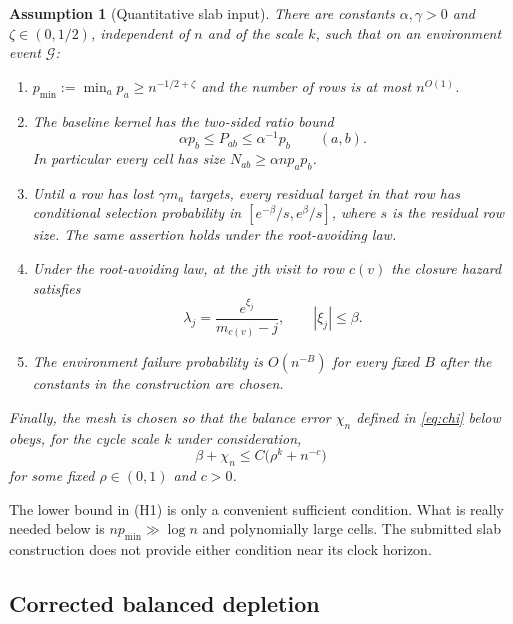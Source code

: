 \documentclass[11pt]{article}
\newcommand{\1}{\mathbf 1}
\newcommand{\cG}{\mathcal G}
\newtheorem{assumption}[theorem]{Assumption}
\theoremstyle{remark}
\begin{document}
\begin{assumption}[Quantitative slab input]\label{ass:slab}
There are constants $\alpha,\gamma>0$ and $\zeta\in(0,1/2)$, independent of $n$ and of the
scale $k$, such that on an environment event $\cG$:
\begin{enumerate}[label=(H\arabic*)]
\item $p_{\min}:=\min_a p_a\ge n^{-1/2+\zeta}$ and the number of rows is at
most $n^{O(1)}$.
\item The baseline kernel has the two-sided ratio bound
\begin{equation}\label{eq:ratio-correct}
 \alpha p_b\le P_{ab}\le \alpha^{-1}p_b
 \qquad(a,b).
\end{equation}
In particular every cell has size
$N_{ab}\ge \alpha n p_ap_b$.
\item Until a row has lost $\gamma m_a$ targets, every residual target in
that row has conditional selection probability in
$[e^{-\beta}/s,e^\beta/s]$, where $s$ is the residual row size.
The same assertion holds under the root-avoiding law.
\item Under the root-avoiding law, at the $j$th visit to row $c(v)$ the
closure hazard satisfies
\begin{equation}\label{eq:hazard-correct-ass}
 \lambda_j=\frac{e^{\xi_j}}{m_{c(v)}-j},\qquad |\xi_j|\le\beta.
\end{equation}
\item The environment failure probability is $O(n^{-B})$ for every fixed
$B$ after the constants in the construction are chosen.
\end{enumerate}
Finally, the mesh is chosen so that the balance error $\chi_n$ defined in
\eqref{eq:chi} below obeys, for the cycle scale $k$ under consideration,
\begin{equation}\label{eq:parameter-input}
 \beta+\chi_n\le C\bigl(\rho^k+n^{-c}\bigr)
\end{equation}
for some fixed $\rho\in(0,1)$ and $c>0$.
\end{assumption}

The lower bound in (H1) is only a convenient sufficient condition.  What is
really needed below is $np_{\min}\gg\log n$ and polynomially large cells.
The submitted slab construction does not provide either condition near its
clock horizon.

\subsection{Corrected balanced depletion}
\end{document}
